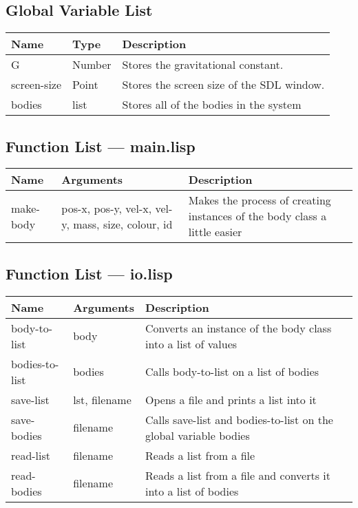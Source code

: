 \subsection{Global Variable List}
\begin{tabular}{p{}p{}p{}}
	Name & Type & Description \\ \hline
	G & Number & Stores the gravitational constant.\\
	screen-size & Point & Stores the screen size of the SDL window. \\
	bodies & list & Stores all of the bodies in the system \\

\end{tabular}

\subsection{Function List --- main.lisp}
\begin{tabular}{p{}p{}p{}}
	Name & Arguments & Description\\ \hline
	make-body & pos-x, pos-y, vel-x, vel-y, mass, size, colour, id &
		Makes the process of creating instances of the body class a
		little easier\\
\end{tabular}

\subsection{Function List --- io.lisp}
\begin{tabular}{p{}p{}p{}}
	Name & Arguments & Description\\ \hline
	body-to-list & body & Converts an instance of the body class into a list
	of values \\ 
	bodies-to-list & bodies & Calls body-to-list on a list of bodies \\
	save-list & lst, filename & Opens a file and prints a list into it \\
	save-bodies & filename & Calls save-list and bodies-to-list on the
	global variable bodies \\
	read-list & filename & Reads a list from a file \\
	read-bodies & filename & Reads a list from a file and converts it into a
	list of bodies \\ 
\end{tabular}

